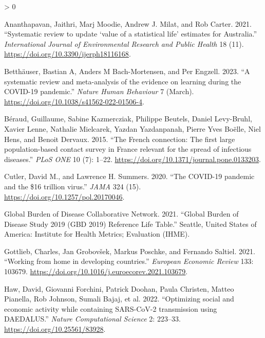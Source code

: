 \documentclass[
]{article}
\newlength{\cslhangindent}
\newenvironment{CSLReferences}[2] %
 {%
  \setlength{\parindent}{0pt}
  \ifodd #1 \everypar{\setlength{\hangindent}{\cslhangindent}}\ignorespaces\fi
  \ifnum #2 > 0
  \setlength{\parskip}{#2\baselineskip}
  \fi
 }%
 {}
\begin{document}
\hypertarget{refs}{}
\begin{CSLReferences}{1}{0}
\leavevmode\hypertarget{ref-Ananthapavan2021}{}%
Ananthapavan, Jaithri, Marj Moodie, Andrew J. Milat, and Rob Carter. 2021. {``{Systematic review to update `value of a statistical life' estimates for Australia}.''} \emph{International Journal of Environmental Research and Public Health} 18 (11). \url{https://doi.org/10.3390/ijerph18116168}.

\leavevmode\hypertarget{ref-Betthauser2023}{}%
Betthäuser, Bastian A, Anders M Bach-Mortensen, and Per Engzell. 2023. {``{A systematic review and meta-analysis of the evidence on learning during the COVID-19 pandemic}.''} \emph{Nature Human Behaviour} 7 (March). \url{https://doi.org/10.1038/s41562-022-01506-4}.

\leavevmode\hypertarget{ref-Beraud2015}{}%
Béraud, Guillaume, Sabine Kazmercziak, Philippe Beutels, Daniel Levy-Bruhl, Xavier Lenne, Nathalie Mielcarek, Yazdan Yazdanpanah, Pierre Yves Boëlle, Niel Hens, and Benoit Dervaux. 2015. {``{The French connection: The first large population-based contact survey in France relevant for the spread of infectious diseases}.''} \emph{PLoS ONE} 10 (7): 1--22. \url{https://doi.org/10.1371/journal.pone.0133203}.

\leavevmode\hypertarget{ref-Cutler2020}{}%
Cutler, David M., and Lawrence H. Summers. 2020. {``{The COVID-19 pandemic and the {\$}16 trillion virus}.''} \emph{JAMA} 324 (15). \url{https://doi.org/10.1257/pol.20170046}.

\leavevmode\hypertarget{ref-GlobalBurdenofDiseaseCollaborativeNetwork2021}{}%
Global Burden of Disease Collaborative Network. 2021. {``{Global Burden of Disease Study 2019 (GBD 2019) Reference Life Table}.''} Seattle, United States of America: Institute for Health Metrics; Evaluation (IHME).

\leavevmode\hypertarget{ref-Gottlieb2021}{}%
Gottlieb, Charles, Jan Grobovšek, Markus Poschke, and Fernando Saltiel. 2021. {``{Working from home in developing countries}.''} \emph{European Economic Review} 133: 103679. \url{https://doi.org/10.1016/j.euroecorev.2021.103679}.

\leavevmode\hypertarget{ref-Haw2020}{}%
Haw, David, Giovanni Forchini, Patrick Doohan, Paula Christen, Matteo Pianella, Rob Johnson, Sumali Bajaj, et al. 2022. {``{Optimizing social and economic activity while containing SARS-CoV-2 transmission using DAEDALUS}.''} \emph{Nature Computational Science} 2: 223--33. \url{https://doi.org/10.25561/83928}.


\end{CSLReferences}
\end{document}
